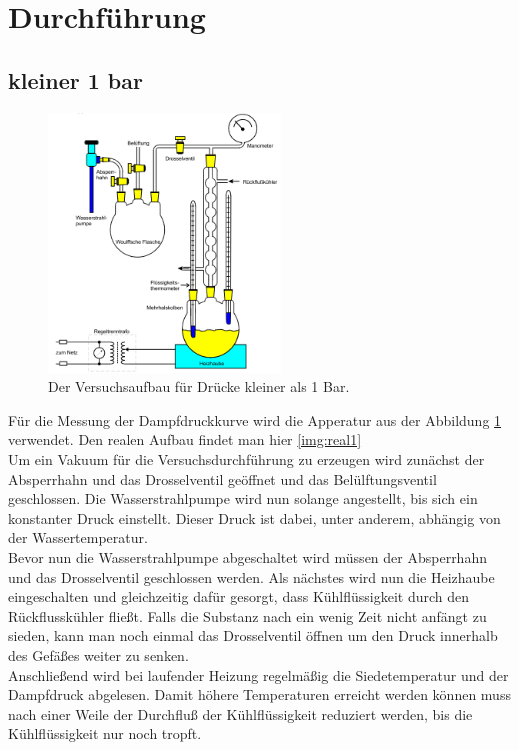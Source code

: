 \section{Durchführung}

\subsection{kleiner 1 bar}
\begin{figure}[H]
    \centering
    \includegraphics[width=0.55\textwidth]{images/Abbildung3.PNG}
    \caption{Der Versuchsaufbau für Drücke kleiner als 1 Bar.}
    \label{img:aufbau1}
\end{figure}
Für die Messung der Dampfdruckkurve wird die Apperatur aus der Abbildung \ref{img:aufbau1} verwendet. Den realen Aufbau findet man hier \ref{img:real1}  \\
Um ein Vakuum für die Versuchsdurchführung zu erzeugen wird zunächst der Absperrhahn und das Drosselventil geöffnet und das Belülftungsventil geschlossen. 
Die Wasserstrahlpumpe wird nun solange angestellt, bis sich ein konstanter Druck einstellt. 
Dieser Druck ist dabei, unter anderem, abhängig von der Wassertemperatur.\\
Bevor nun die Wasserstrahlpumpe abgeschaltet wird müssen der Absperrhahn und das Drosselventil geschlossen werden. Als nächstes wird nun die Heizhaube 
eingeschalten und gleichzeitig dafür gesorgt, dass Kühlflüssigkeit durch den Rückflusskühler fließt. Falls die Substanz nach ein wenig Zeit 
nicht anfängt zu sieden, kann man noch einmal das Drosselventil öffnen um den Druck innerhalb des Gefäßes weiter zu senken.\\
Anschließend wird bei laufender Heizung regelmäßig die Siedetemperatur und der Dampfdruck abgelesen. Damit höhere Temperaturen erreicht werden können
muss nach einer Weile der Durchfluß der Kühlflüssigkeit reduziert werden, bis die Kühlflüssigkeit nur noch tropft.



